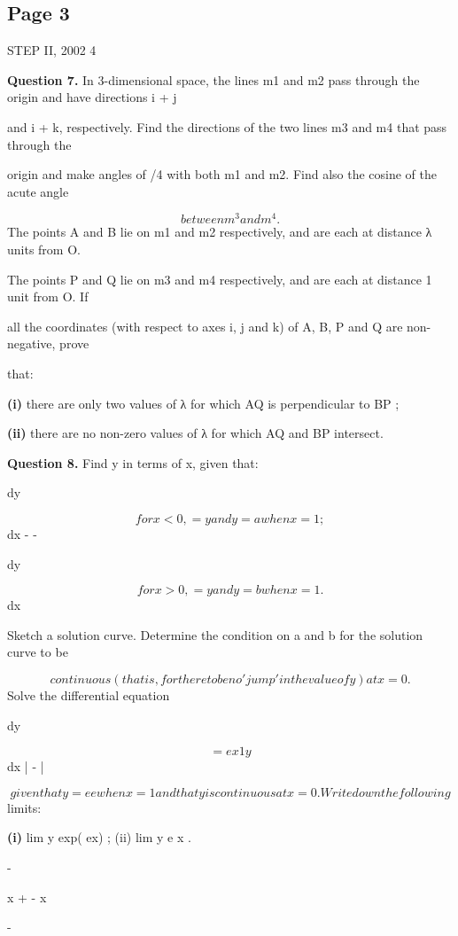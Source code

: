 \documentclass[12pt]{article}
\begin{document}
\subsection*{Page 3}
\begin{flushleft}
STEP II, 2002 4\par
\bigskip\textbf{Question 7.} In 3-dimensional space, the lines m1 and m2 pass through the origin and have directions i + j\par
and i + k, respectively. Find the directions of the two lines m3 and m4 that pass through the\par
origin and make angles of \pi/4 with both m1 and m2. Find also the cosine of the acute angle\par
\[between m^3 and m^4.\]
The points A and B lie on m1 and m2 respectively, and are each at distance λ units from O.\par
The points P and Q lie on m3 and m4 respectively, and are each at distance 1 unit from O. If\par
all the coordinates (with respect to axes i, j and k) of A, B, P and Q are non-negative, prove\par
that:\par
\textbf{(i)} there are only two values of λ for which AQ is perpendicular to BP ;\par
\textbf{(ii)} there are no non-zero values of λ for which AQ and BP intersect.\par
\bigskip\textbf{Question 8.} Find y in terms of x, given that:\par
dy\par
\[for x < 0 , = y and y = a when x = 1 ;\]
dx - -\par
dy\par
\[for x > 0 , = y and y = b when x = 1 .\]
dx\par
Sketch a solution curve. Determine the condition on a and b for the solution curve to be\par
\[continuous (that is, for there to be no 'jump' in the value of y) at x = 0.\]
Solve the differential equation\par
dy\par
\[= ex 1 y\]
dx | - |\par
\[given that y = e e when x = 1 and that y is continuous at x = 0 . Write down the following\]
limits:\par
\textbf{(i)} lim y exp( ex) ; (ii) lim y e x .\par
-\par
x + - x\par
\to \infty \to-\infty\par
\end{flushleft}
\end{document}
